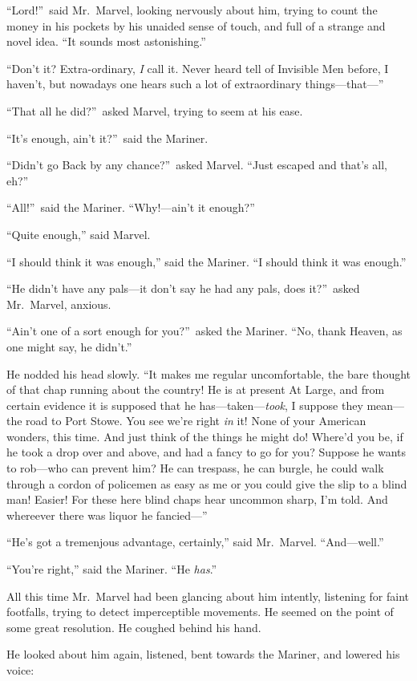 “Lord!”\ said Mr.\ Marvel, looking nervously about him, trying to count the money in his pockets by his unaided sense of touch, and full of a strange and novel idea. “It sounds most astonishing.”

“Don’t it? Extra-ordinary, \emph{I} call it. Never heard tell of Invisible Men before, I haven’t, but nowadays one hears such a lot of extraordinary things—that—”

“That all he did?”\ asked Marvel, trying to seem at his ease.

“It’s enough, ain’t it?”\ said the Mariner.

“Didn’t go Back by any chance?”\ asked Marvel. “Just escaped and that’s all, eh?”

“All!”\ said the Mariner. “Why!—ain’t it enough?”

“Quite enough,” said Marvel.

“I should think it was enough,” said the Mariner. “I should think it was enough.”

“He didn’t have any pals—it don’t say he had any pals, does it?”\ asked Mr.\ Marvel, anxious.

“Ain’t one of a sort enough for you?”\ asked the Mariner. “No, thank Heaven, as one might say, he didn’t.”

He nodded his head slowly. “It makes me regular uncomfortable, the bare thought of that chap running about the country! He is at present At Large, and from certain evidence it is supposed that he has—taken—\emph{took}, I suppose they mean—the road to Port Stowe. You see we’re right \emph{in} it! None of your American wonders, this time. And just think of the things he might do! Where’d you be, if he took a drop over and above, and had a fancy to go for you? Suppose he wants to rob—who can prevent him? He can trespass, he can burgle, he could walk through a cordon of policemen as easy as me or you could give the slip to a blind man! Easier! For these here blind chaps hear uncommon sharp, I’m told. And whereever there was liquor he fancied—”

“He’s got a tremenjous advantage, certainly,” said Mr.\ Marvel. “And—well.”

“You’re right,” said the Mariner. “He \emph{has}.”

All this time Mr.\ Marvel had been glancing about him intently, listening for faint footfalls, trying to detect imperceptible movements. He seemed on the point of some great resolution. He coughed behind his hand.

He looked about him again, listened, bent towards the Mariner, and lowered his voice:


